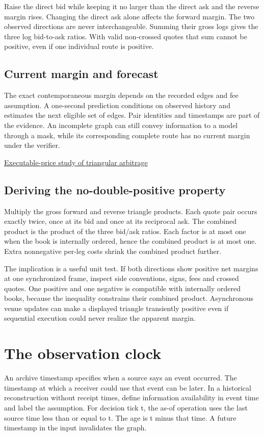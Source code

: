 \documentclass[11pt,oneside,openany]{book}
\begin{document}
Raise the direct bid while keeping it no larger than the direct ask and the reverse margin rises. Changing the direct ask alone affects the forward margin. The two observed directions are never interchangeable. Summing their gross logs gives the three log bid-to-ask ratios. With valid non-crossed quotes that sum cannot be positive, even if one individual route is positive.

\section*{Current margin and forecast}
The exact contemporaneous margin depends on the recorded edges and fee assumption. A one-second prediction conditions on observed history and estimates the next eligible set of edges. Pair identities and timestamps are part of the evidence. An incomplete graph can still convey information to a model through a mask, while its corresponding complete route has no current margin under the verifier.

{\small\sffamily\href{https://arxiv.org/abs/0812.0913}{Executable-price study of triangular arbitrage}\par}
\section*{Deriving the no-double-positive property}
Multiply the gross forward and reverse triangle products. Each quote pair occurs exactly twice, once at its bid and once at its reciprocal ask. The combined product is the product of the three bid/ask ratios. Each factor is at most one when the book is internally ordered, hence the combined product is at most one. Extra nonnegative per-leg costs shrink the combined product further.

The implication is a useful unit test. If both directions show positive net margins at one synchronized frame, inspect side conventions, signs, fees and crossed quotes. One positive and one negative is compatible with internally ordered books, because the inequality constrains their combined product. Asynchronous venue updates can make a displayed triangle transiently positive even if sequential execution could never realize the apparent margin.

\chapter{The observation clock}
An archive timestamp specifies when a source says an event occurred. The timestamp at which a receiver could use that event can be later. In a historical reconstruction without receipt times, define information availability in event time and label the assumption. For decision tick t, the as-of operation uses the last source time less than or equal to t. The age is t minus that time. A future timestamp in the input invalidates the graph.
\end{document}
